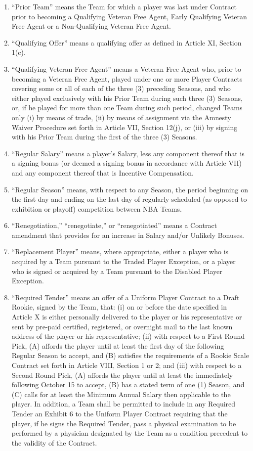 \documentclass[
]{book}
\begin{document}
\begin{enumerate}
\item
  ``Prior Team'' means the Team for which a player was last under Contract prior to becoming a Qualifying Veteran Free Agent, Early Qualifying Veteran Free Agent or a Non-Qualifying Veteran Free Agent.
\item
  ``Qualifying Offer'' means a qualifying offer as defined in Article XI, Section 1(c).
\item
  ``Qualifying Veteran Free Agent'' means a Veteran Free Agent who, prior to becoming a Veteran Free Agent, played under one or more Player Contracts covering some or all of each of the three (3) preceding Seasons, and who either played exclusively with his Prior Team during such three (3) Seasons, or, if he played for more than one Team during such period, changed Teams only (i) by means of trade, (ii) by means of assignment via the Amnesty Waiver Procedure set forth in Article VII, Section 12(j), or (iii) by signing with his Prior Team during the first of the three (3) Seasons.
\item
  ``Regular Salary'' means a player's Salary, less any component thereof that is a signing bonus (or deemed a signing bonus in accordance with Article VII) and any component thereof that is Incentive Compensation.
\item
  ``Regular Season'' means, with respect to any Season, the period beginning on the first day and ending on the last day of regularly scheduled (as opposed to exhibition or playoff) competition between NBA Teams.
\item
  ``Renegotiation,'' ``renegotiate,'' or ``renegotiated'' means a Contract amendment that provides for an increase in Salary and/or Unlikely Bonuses.
\item
  ``Replacement Player'' means, where appropriate, either a player who is acquired by a Team pursuant to the Traded Player Exception, or a player who is signed or acquired by a Team pursuant to the Disabled Player Exception.
\item
  ``Required Tender'' means an offer of a Uniform Player Contract to a Draft Rookie, signed by the Team, that: (i) on or before the date specified in Article X is either personally delivered to the player or his representative or sent by pre-paid certified, registered, or overnight mail to the last known address of the player or his representative; (ii) with respect to a First Round Pick, (A) affords the player until at least the first day of the following Regular Season to accept, and (B) satisfies the requirements of a Rookie Scale Contract set forth in Article VIII, Section 1 or 2; and (iii) with respect to a Second Round Pick, (A) affords the player until at least the immediately following October 15 to accept, (B) has a stated term of one (1) Season, and (C) calls for at least the Minimum Annual Salary then applicable to the player. In addition, a Team shall be permitted to include in any Required Tender an Exhibit 6 to the Uniform Player Contract requiring that the player, if he signs the Required Tender, pass a physical examination to be performed by a physician designated by the Team as a condition precedent to the validity of the Contract.

\end{enumerate}
\end{document}
